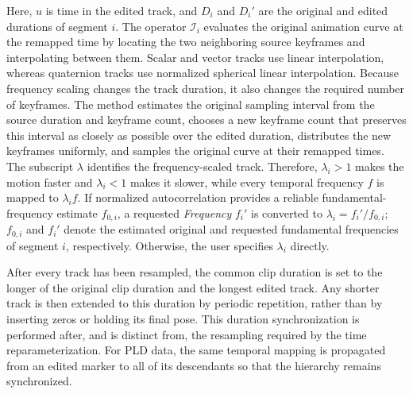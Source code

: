 \documentclass[12pt]{article}
\begin{document}
Here, $u$ is time in the edited track, and $D_i$ and $D_i'$ are the
original and edited durations of segment $i$. The operator
$\mathcal{I}_i$ evaluates the original animation curve at the remapped
time by locating the two neighboring source keyframes and interpolating
between them. Scalar and vector tracks use linear interpolation, whereas
quaternion tracks use normalized spherical linear interpolation. Because
frequency scaling changes the track duration, it also changes the required
number of keyframes. The method estimates the original sampling interval
from the source duration and keyframe count, chooses a new keyframe count
that preserves this interval as closely as possible over the edited
duration, distributes the new keyframes uniformly, and samples the
original curve at their remapped times. The subscript $\lambda$ identifies
the frequency-scaled track. Therefore, $\lambda_i>1$ makes the motion
faster and
$\lambda_i<1$ makes it slower, while every temporal frequency $f$ is
mapped to $\lambda_i f$. If normalized autocorrelation provides a
reliable fundamental-frequency estimate $f_{0,i}$, a requested
\textit{Frequency} $f_i'$ is converted to
$\lambda_i=f_i'/f_{0,i}$; $f_{0,i}$ and $f_i'$ denote the estimated
original and requested fundamental frequencies of segment $i$,
respectively. Otherwise, the user specifies $\lambda_i$ directly.

After every track has been resampled, the common clip duration is set to
the longer of the original clip duration and the longest edited track.
Any shorter track is then extended to this duration by periodic repetition,
rather than by inserting zeros or holding its final pose. This duration
synchronization is performed after, and is distinct from, the resampling
required by the time reparameterization. For PLD data, the same temporal
mapping is propagated from an edited marker to all of its descendants so
that the hierarchy remains synchronized.





\end{document}
